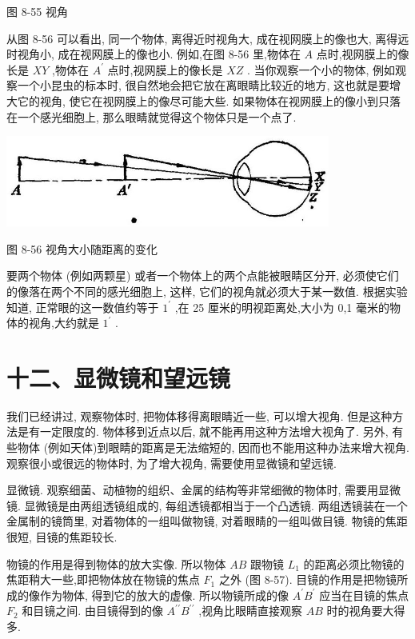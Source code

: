 \documentclass[10pt]{article}
\begin{document}
图 8-55 视角

从图 8-56 可以看出, 同一个物体, 离得近时视角大, 成在视网膜上的像也大, 离得远时视角小, 成在视网膜上的像也小. 例如,在图 8-56 里,物体在 \(A\) 点时,视网膜上的像长是 \({XY}\) ,物体在 \({A}^{\prime }\) 点时,视网膜上的像长是 \({XZ}\) . 当你观察一个小的物体, 例如观察一个小昆虫的标本时, 很自然地会把它放在离眼睛比较近的地方, 这也就是要增大它的视角, 使它在视网膜上的像尽可能大些. 如果物体在视网膜上的像小到只落在一个感光细胞上, 那么眼睛就觉得这个物体只是一个点了.

\begin{center}
\includegraphics[max width=0.8\textwidth]{images/01913056-1f15-74d8-9184-9aab52c9d66b_289_160031.jpg}
\end{center}

图 8-56 视角大小随距离的变化

要两个物体 (例如两颗星) 或者一个物体上的两个点能被眼睛区分开, 必须使它们的像落在两个不同的感光细胞上, 这样, 它们的视角就必须大于某一数值. 根据实验知道, 正常眼的这一数值约等于 \({1}^{\prime }\) ,在 25 厘米的明视距离处,大小为 0,1 毫米的物体的视角,大约就是 \({1}^{\prime }\) .

\section*{十二、显微镜和望远镜}

我们已经讲过, 观察物体时, 把物体移得离眼睛近一些, 可以增大视角. 但是这种方法是有一定限度的. 物体移到近点以后, 就不能再用这种方法增大视角了. 另外, 有些物体 (例如天体)到眼睛的距离是无法缩短的, 因而也不能用这种办法来增大视角. 观察很小或很远的物体时, 为了增大视角, 需要使用显微镜和望远镜.

显微镜. 观察细菌、动植物的组织、金属的结构等非常细微的物体时, 需要用显微镜. 显微镜是由两组透镜组成的, 每组透镜都相当于一个凸透镜. 两组透镜装在一个金属制的镜筒里, 对着物体的一组叫做物镜, 对着眼睛的一组叫做目镜. 物镜的焦距很短, 目镜的焦距较长.

物镜的作用是得到物体的放大实像. 所以物体 \({AB}\) 跟物镜 \({L}_{1}\) 的距离必须比物镜的焦距稍大一些,即把物体放在物镜的焦点 \({F}_{1}\) 之外 (图 8-57). 目镜的作用是把物镜所成的像作为物体, 得到它的放大的虚像. 所以物镜所成的像 \({A}^{\prime }{B}^{\prime }\) 应当在目镜的焦点 \({F}_{2}\) 和目镜之间. 由目镜得到的像 \({A}^{\prime \prime }{B}^{\prime \prime }\) ,视角比眼睛直接观察 \({AB}\) 时的视角要大得多.
\end{document}
